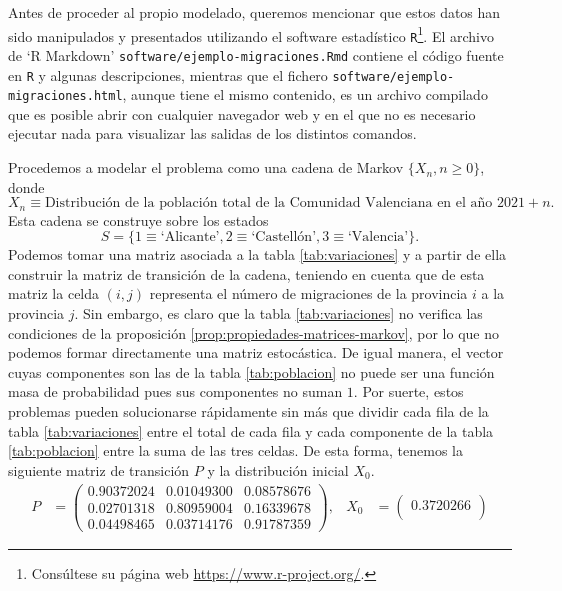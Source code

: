 \begin{ejemplo}
        Antes de proceder al propio modelado, queremos mencionar que estos datos han sido manipulados y presentados utilizando el software estadístico \texttt{R}\footnote{Consúltese su página web \url{https://www.r-project.org/}.}. El archivo de `R Markdown' \texttt{software/ejemplo-migraciones.Rmd} 
        contiene el código fuente en \texttt{R} y algunas descripciones, mientras que el fichero \texttt{software/ejemplo-migraciones.html}, aunque tiene el mismo contenido, es un archivo compilado que es posible abrir con cualquier navegador web y en el que no es necesario ejecutar nada para visualizar las salidas de los distintos comandos. 

        Procedemos a modelar el problema como una cadena de Markov $\{X_n,n\geq0\}$, donde 
        $$X_n \equiv \text{Distribución de la población total de la Comunidad Valenciana en el año }2021+n.$$ 
        Esta cadena se construye sobre los estados 
        $$
        S=\{1\equiv\text{`Alicante'}, 2\equiv\text{`Castellón'},3\equiv\text{`Valencia'}\}.
        $$
        Podemos tomar una matriz asociada a la tabla \ref{tab:variaciones} y a partir de ella construir la matriz de transición de la cadena, teniendo en cuenta que de esta matriz la celda $(i,j)$ representa el número de migraciones de la provincia $i$ a la provincia $j$. Sin embargo, es claro que la tabla \ref{tab:variaciones} no verifica las condiciones de la proposición \ref{prop:propiedades-matrices-markov}, por lo que no podemos formar directamente una matriz estocástica. De igual manera, el vector cuyas componentes son las de la tabla \ref{tab:poblacion} no puede ser una función masa de probabilidad pues sus componentes no suman $1$. Por suerte, estos problemas pueden solucionarse rápidamente sin más que dividir cada fila de la tabla \ref{tab:variaciones} entre el total de cada fila y cada componente de la tabla \ref{tab:poblacion} entre la suma de las tres celdas. De esta forma, tenemos la siguiente matriz de transición $P$ y la distribución inicial $X_0$.
        \begin{align*}
            \label{eq:ejemplo-migraciones-matriz}
            P &= \begin{pmatrix}
                0.90372024 & 0.01049300 & 0.08578676 \\
                0.02701318 & 0.80959004 & 0.16339678 \\
                0.04498465 & 0.03714176 & 0.91787359
            \end{pmatrix}, & X_0 &= \begin{pmatrix}
                0.3720266 \\

\end{pmatrix}
\end{align*}
\end{ejemplo}
